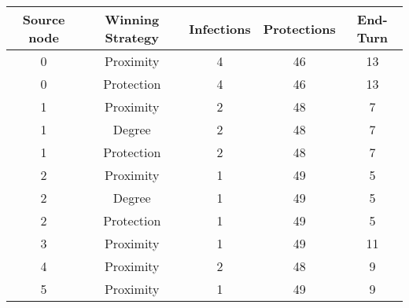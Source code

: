 \documentclass[results.tex]{subfiles}
\begin{document}
    \begin{center}
        \begin{tabular}{| c || c | c | c | c |}
            \hline
            {\bfseries Source node} & {\bfseries Winning Strategy} & {\bfseries Infections} & {\bfseries Protections}
            & {\bfseries End-Turn}
            \\  %
            \hline\hline
            0                       & Proximity                    & 4                      & 46                      & 13                   \\
            \hline
            0                       & Protection                   & 4                      & 46                      & 13                   \\
            \hline
            1                       & Proximity                    & 2                      & 48                      & 7                    \\
            \hline
            1                       & Degree                       & 2                      & 48                      & 7                    \\
            \hline
            1                       & Protection                   & 2                      & 48                      & 7                    \\
            \hline
            2                       & Proximity                    & 1                      & 49                      & 5                    \\
            \hline
            2                       & Degree                       & 1                      & 49                      & 5                    \\
            \hline
            2                       & Protection                   & 1                      & 49                      & 5                    \\
            \hline
            3                       & Proximity                    & 1                      & 49                      & 11                   \\
            \hline
            4                       & Proximity                    & 2                      & 48                      & 9                    \\
            \hline
            5                       & Proximity                    & 1                      & 49                      & 9                    \\

\end{tabular}
\end{center}
\end{document}
